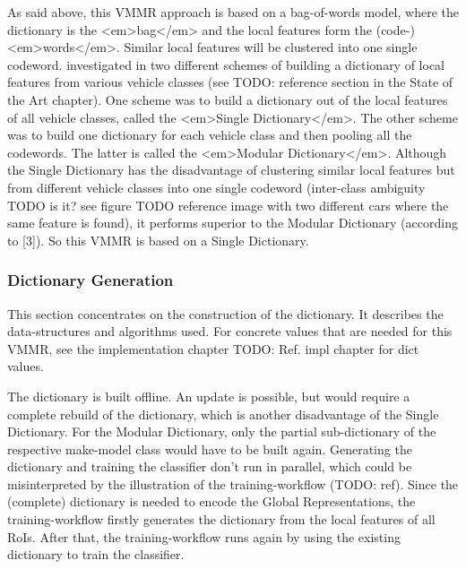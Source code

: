 As said above, this VMMR approach is based on a bag-of-words model, where the dictionary is the <em>bag</em> and the local features form the (code-)<em>words</em>. Similar local features will be clustered into one single codeword. \citeauthor{siddiqui2015robust} \citep{siddiqui2015robust} investigated in two different schemes of building a dictionary of local features from various vehicle classes (see TODO: reference section in the State of the Art chapter). One scheme was to build a dictionary out of the local features of all vehicle classes, called the <em>Single Dictionary</em>. The other scheme was to build one dictionary for each vehicle class and then pooling all the codewords. The latter is called the <em>Modular Dictionary</em>. Although the Single Dictionary has the disadvantage of clustering similar local features but from different vehicle classes into one single codeword (inter-class ambiguity TODO is it? see figure TODO reference image with two different cars where the same feature is found), it performs superior to the Modular Dictionary (according to [3]). So this VMMR is based on a Single Dictionary.

\subsubsection{Dictionary Generation}
This section concentrates on the construction of the dictionary. It describes the data-structures and algorithms used. For concrete values that are needed for this VMMR, see the implementation chapter TODO: Ref. impl chapter for dict values.

The dictionary is built offline. An update is possible, but would require a complete rebuild of the dictionary, which is another disadvantage of the Single Dictionary. For the Modular Dictionary, only the partial sub-dictionary of the respective make-model class would have to be built again. Generating the dictionary and training the classifier don’t run in parallel, which could be misinterpreted by the illustration of the training-workflow (TODO: ref). Since the (complete) dictionary is needed to encode the Global Representations, the training-workflow firstly generates the dictionary from the local features of all RoIs. After that, the training-workflow runs again by using the existing dictionary to train the classifier.











